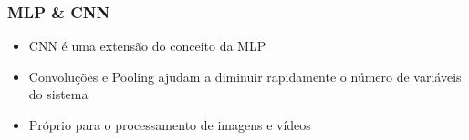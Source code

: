 \documentclass[tikz,11pt]{beamer}
\begin{document}
\begin{frame}
	\frametitle{MLP \& CNN}
	\centering
	\begin{itemize}
		\item CNN é uma extensão do conceito da MLP
		\item Convoluções e Pooling ajudam a diminuir rapidamente o número de variáveis do sistema
		\item Próprio para o processamento de imagens e vídeos		
	\end{itemize}
\end{frame}

\end{document}
